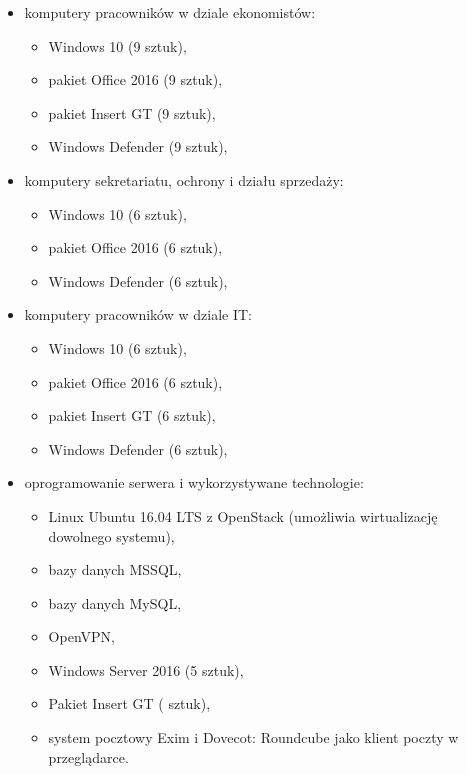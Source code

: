\begin{minipage}[\right]{15cm}
\begin{itemize}
	\item komputery pracowników w dziale ekonomistów:
	\begin{itemize}
		\item Windows 10 (9 sztuk),
		\item pakiet Office 2016 (9 sztuk),
		\item pakiet Insert GT (9 sztuk),
		\item Windows Defender (9 sztuk),
	\end{itemize}
	\item komputery sekretariatu, ochrony i działu sprzedaży:
	\begin{itemize}
		\item Windows 10 (6 sztuk),
		\item pakiet Office 2016 (6 sztuk),
		\item Windows Defender (6 sztuk),
	\end{itemize}
	\item komputery pracowników w dziale IT:
	\begin{itemize}
		\item Windows 10 (6 sztuk),
		\item pakiet Office 2016 (6 sztuk),
		\item pakiet Insert GT (6 sztuk),
		\item Windows Defender (6 sztuk),
	\end{itemize}
	\item oprogramowanie serwera i wykorzystywane technologie:
	\begin{itemize}
		\item Linux Ubuntu 16.04 LTS z OpenStack (umożliwia wirtualizację
		\linebreak dowolnego systemu),
		\item bazy danych MSSQL,
		\item bazy danych MySQL,
		\item OpenVPN,
		\item Windows Server 2016 (5 sztuk),
		\item Pakiet Insert GT ( sztuk),
		\item system pocztowy Exim i Dovecot: Roundcube jako klient poczty \linebreak w przeglądarce.
	\end{itemize}
\end{itemize}
\end{minipage}

